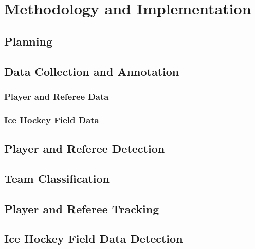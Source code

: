 \documentclass[12pt, letterpaper]{article}
\begin{document}






\section{Methodology and Implementation}

\subsection{Planning}
\subsection{Data Collection and Annotation}
\subsubsection{Player and Referee Data}
\subsubsection{Ice Hockey Field Data}
\subsection{Player and Referee Detection}
\subsection{Team Classification}
\subsection{Player and Referee Tracking}
\subsection{Ice Hockey Field Data Detection}
\end{document}
